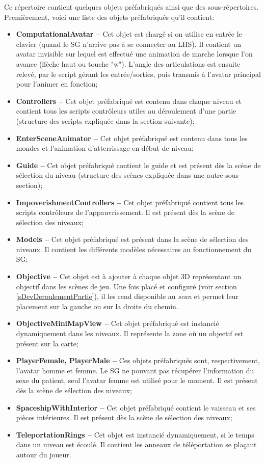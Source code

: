 		Ce répertoire contient quelques objets préfabriqués ainsi que des sous-répertoires. Premièrement, voici une liste des objets préfabriqués qu'il contient:
		\begin{itemize}
			\item \textbf{ComputationalAvatar --} Cet objet est chargé si on utilise en entrée le clavier (quand le SG n'arrive pas à se connecter au LHS). Il contient un avatar invisible sur lequel est effectué une animation de marche lorsque l'on avance (flèche haut ou touche "w"). L'angle des articulations est ensuite relevé, par le script gérant les entrée/sorties, puis transmis à l'avatar principal pour l'animer en fonction;
			\item \textbf{Controllers --} Cet objet préfabriqué est contenu dans chaque niveau et contient tous les scripts contrôleurs utiles au déroulement d'une partie \cite{UnityMVC} (structure des scripts expliquée dans la section suivante);
			\item \textbf{EnterSceneAnimator --} Cet objet préfabriqué est contenu dans tous les mondes et l'animation d'atterrissage en début de niveau;
			\item \textbf{Guide --} Cet objet préfabriqué contient le guide et est présent dès la scène de sélection du niveau (structure des scènes expliquée dans une autre sous-section);
			\item \textbf{ImpoverishmentControllers --} Cet objet préfabriqué contient tous les scripts contrôleurs de l'appauvrissement. Il est présent dès la scène de sélection des niveaux;
			\item \textbf{Models --} Cet objet préfabriqué est présent dans la scène de sélection des niveaux. Il contient les différents modèles \cite{UnityMVC} nécessaires au fonctionnement du SG;
			\item \textbf{Objective --} Cet objet est à ajouter à chaque objet 3D représentant un objectif dans les scènes de jeu. Une fois placé et configuré (voir section \ref{sDevDeroulementPartie}), il les rend disponible au \textit{scan} et permet leur placement sur la gauche ou sur la droite du chemin.
			\item \textbf{ObjectiveMiniMapView --} Cet objet préfabriqué est instancié dynamiquement dans les niveaux. Il représente la zone où un objectif est présent sur la carte;
			\item \textbf{PlayerFemale, PlayerMale --} Ces objets préfabriqués sont, respectivement, l'avatar homme et femme. Le SG ne pouvant pas récupérer l'information du sexe du patient, seul l'avatar femme est utilisé pour le moment. Il est présent dès la scène de sélection des niveaux;
			\item \textbf{SpaceshipWithInterior --} Cet objet préfabriqué contient le vaisseau et ses pièces intérieures. Il est présent dès la scène de sélection des niveaux;
			\item \textbf{TeleportationRings --} Cet objet est instancié dynamiquement, si le temps dans un niveau est écoulé. Il contient les anneaux de téléportation se plaçant autour du joueur.
		\end{itemize}
		
